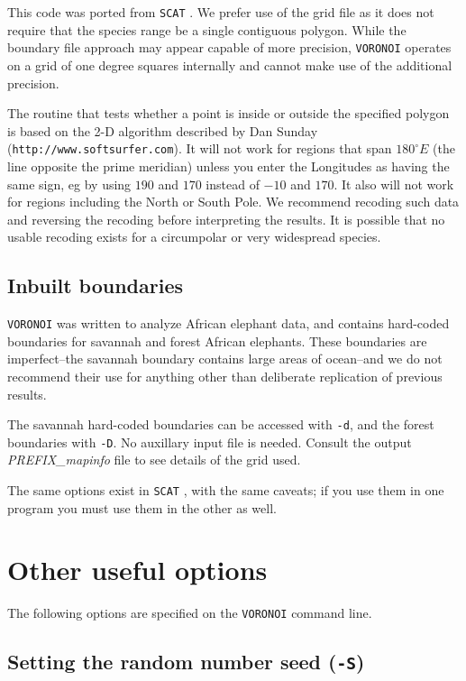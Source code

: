 \documentclass[10pt,titlepage,times,letterpaper]{article}
\def\SCAT{{\tt SCAT} }
\def\VORONOI{{\tt VORONOI} }
\begin{document}
This code was ported from \SCAT.  We prefer use of the grid file as it does not
require that the species range be a single contiguous polygon.  While the boundary
file approach may appear capable of more precision, \VORONOI operates on a grid of
one degree squares internally and cannot make use of the additional precision.

The routine that tests whether a point is inside or outside
the specified polygon is based on the 2-D algorithm 
described by Dan Sunday ({\tt http://www.softsurfer.com}). 
It will not work for regions that span
$180^\circ E$ (the line opposite the prime meridian) unless you enter
the Longitudes as having the same sign, eg by using $190$ and $170$
instead of $-10$ and $170$. It also will not work for regions
including the North or South Pole.   We recommend recoding such
data and reversing the recoding before interpreting the results.  It
is possible that no usable recoding exists for a circumpolar or very widespread species.

\subsection{Inbuilt boundaries}

\VORONOI was written to analyze African elephant data, and contains hard-coded
boundaries for savannah and forest African elephants.  These boundaries are 
imperfect--the savannah boundary contains large areas of ocean--and we do not
recommend their use for anything other than deliberate replication of previous results.

The savannah hard-coded boundaries can be accessed with {\tt -d}, and the 
forest boundaries with {\tt -D}.  No auxillary input file is needed.  Consult
the output {\it PREFIX\_mapinfo} file to see details of the grid used.

The same options exist in \SCAT, with the same caveats; if you use them in one
program you must use them in the other as well.

\section{Other useful options}

The following options are specified on the \VORONOI command line.

\subsection{Setting the random number seed  ({\tt -S})}
\end{document}
